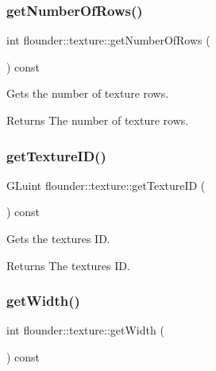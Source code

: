\subsubsection{\texorpdfstring{get\+Number\+Of\+Rows()}{getNumberOfRows()}}
{\footnotesize\ttfamily int flounder\+::texture\+::get\+Number\+Of\+Rows (\begin{DoxyParamCaption}{ }\end{DoxyParamCaption}) const\hspace{0.3cm}{\ttfamily [inline]}}



Gets the number of texture rows. 

\begin{DoxyReturn}{Returns}
The number of texture rows. 
\end{DoxyReturn}
\mbox{\label{classflounder_1_1texture_a2f9a420fd96169046fb3494d4b7dcd90}} 
\subsubsection{\texorpdfstring{get\+Texture\+I\+D()}{getTextureID()}}
{\footnotesize\ttfamily G\+Luint flounder\+::texture\+::get\+Texture\+ID (\begin{DoxyParamCaption}{ }\end{DoxyParamCaption}) const\hspace{0.3cm}{\ttfamily [inline]}}



Gets the textures ID. 

\begin{DoxyReturn}{Returns}
The textures ID. 
\end{DoxyReturn}
\mbox{\label{classflounder_1_1texture_af4502c9224b20f452b25918dbaaa2d3a}} 
\subsubsection{\texorpdfstring{get\+Width()}{getWidth()}}
{\footnotesize\ttfamily int flounder\+::texture\+::get\+Width (\begin{DoxyParamCaption}{ }\end{DoxyParamCaption}) const\hspace{0.3cm}{\ttfamily [inline]}}




